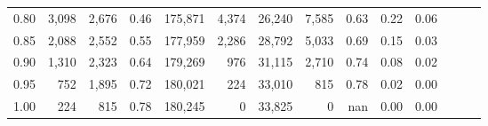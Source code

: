 \begin{tabular}{rrrrrrrrrrrrrr}
0.80 &   3,098 &  2,676 &  0.46 &  175,871 &    4,374 &  26,240 &   7,585 &  0.63 &  0.22 &      0.06 \\
0.85 &   2,088 &  2,552 &  0.55 &  177,959 &    2,286 &  28,792 &   5,033 &  0.69 &  0.15 &      0.03 \\
0.90 &   1,310 &  2,323 &  0.64 &  179,269 &      976 &  31,115 &   2,710 &  0.74 &  0.08 &      0.02 \\
0.95 &     752 &  1,895 &  0.72 &  180,021 &      224 &  33,010 &     815 &  0.78 &  0.02 &      0.00 \\
1.00 &     224 &    815 &  0.78 &  180,245 &        0 &  33,825 &       0 &   nan &  0.00 &      0.00 \\
\bottomrule
\end{tabular}
